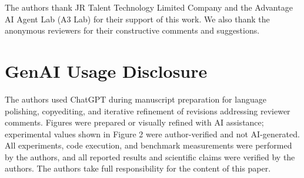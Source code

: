 \documentclass[sigconf]{acmart}
\begin{document}
\begin{acks}
The authors thank JR Talent Technology Limited Company and the Advantage AI Agent Lab (A3 Lab) for their support of this work. We also thank the anonymous reviewers for their constructive comments and suggestions.
\end{acks}

\section*{GenAI Usage Disclosure}
The authors used ChatGPT during manuscript preparation for language polishing, copyediting, and iterative refinement of revisions addressing reviewer comments. Figures were prepared or visually refined with AI assistance; experimental values shown in Figure 2 were author-verified and not AI-generated. All experiments, code execution, and benchmark measurements were performed by the authors, and all reported results and scientific claims were verified by the authors. The authors take full responsibility for the content of this paper.



\end{document}
